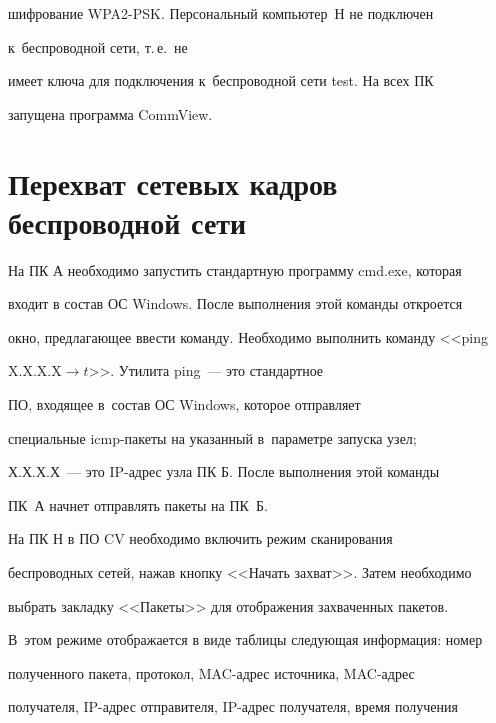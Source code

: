 шифрование WPA2-PSK. Персональный компьютер~Н не подключен


к~беспроводной сети, т.\,е.\ не


имеет ключа для подключения к~беспроводной сети test. На всех ПК


запущена программа CommView.





\vspace*{-4pt}





\section{Перехват сетевых кадров беспроводной сети}





\vspace*{-2pt}





   На ПК А необходимо запустить стандартную программу {\sf cmd.exe}, которая


входит в состав ОС Windows. После выполнения этой команды откроется


окно, предлагающее ввести команду. Необходимо выполнить команду <<ping


X.X.X.X\;$\to$\;$t$>>. Утилита ping~--- это стандартное


ПО, входящее в~со\-став ОС Windows, которое отправляет


специальные icmp-па\-ке\-ты на указанный в~па\-ра\-мет\-ре запуска узел;


   Х.Х.Х.Х~--- это IP-ад\-рес узла ПК Б. После выполнения этой команды


ПК~А начнет отправлять пакеты на ПК~Б.





   На ПК Н в ПО CV необходимо включить режим сканирования


беспроводных сетей, нажав кнопку <<Начать захват>>. Затем необходимо


выбрать закладку <<Пакеты>> для отображения захваченных пакетов.


В~этом режиме отображается в виде таблицы следующая информация: номер


полученного пакета, протокол, MAC-ад\-рес источника, MAC-ад\-рес


получателя, IP-ад\-рес отправителя, IP-ад\-рес получателя, время получения


